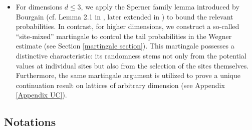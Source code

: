 \documentclass[11pt,reqno,UTF8,twoside]{amsart}
\theoremstyle{definition}
\numberwithin{equation}{section}
\begin{document}
\begin{itemize}
  
    \item For dimensions $d\le 3$, we apply the Sperner family lemma introduced by Bourgain (cf. Lemma 2.1 in \cite{Bou04}, later extended in \cite{DS20}) to bound the relevant probabilities. In contrast, for higher dimensions, we construct a so-called ``site-mixed'' martingale to control the tail probabilities in the Wegner estimate (see Section \ref{martingale section}). This martingale possesses a distinctive characteristic: its randomness stems not only from the potential values at individual sites but also from the selection of the sites themselves. Furthermore, the same martingale argument is utilized to prove a unique continuation result on lattices of arbitrary dimension (see Appendix \ref{Appendix UC}).

\end{itemize}




\subsection{Notations}
\end{document}
